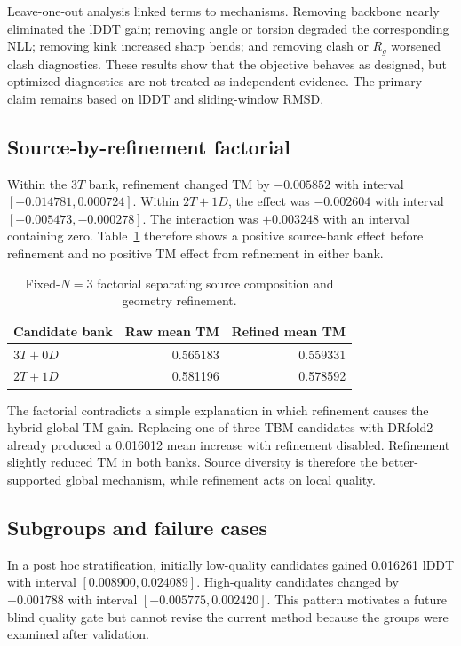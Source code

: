 \documentclass[12pt,a4paper,oneside]{report}
\begin{document}
Leave-one-out analysis linked terms to mechanisms. Removing backbone nearly eliminated
the lDDT gain; removing angle or torsion degraded the corresponding NLL; removing kink
increased sharp bends; and removing clash or $R_g$ worsened clash diagnostics. These
results show that the objective behaves as designed, but optimized diagnostics are not
treated as independent evidence. The primary claim remains based on lDDT and
sliding-window RMSD.

\subsection{Source-by-refinement factorial}

Within the $3T$ bank, refinement changed TM by $-0.005852$ with interval
$[-0.014781,0.000724]$. Within $2T+1D$, the effect was $-0.002604$ with interval
$[-0.005473,-0.000278]$. The interaction was $+0.003248$ with an interval containing
zero. Table~\ref{tab:factorial_en} therefore shows a positive source-bank effect before
refinement and no positive TM effect from refinement in either bank.

\begin{table}[H]
\centering
\caption{Fixed-$N=3$ factorial separating source composition and geometry refinement.}
\label{tab:factorial_en}
\begin{tabular}{lrr}
\toprule
Candidate bank & Raw mean TM & Refined mean TM \\
\midrule
$3T+0D$ & 0.565183 & 0.559331 \\
$2T+1D$ & 0.581196 & 0.578592 \\
\bottomrule
\end{tabular}
\end{table}

The factorial contradicts a simple explanation in which refinement causes the hybrid
global-TM gain. Replacing one of three TBM candidates with DRfold2 already produced a
0.016012 mean increase with refinement disabled. Refinement slightly reduced TM in both
banks. Source diversity is therefore the better-supported global mechanism, while
refinement acts on local quality.

\subsection{Subgroups and failure cases}

In a post hoc stratification, initially low-quality candidates gained 0.016261 lDDT with
interval $[0.008900,0.024089]$. High-quality candidates changed by $-0.001788$ with
interval $[-0.005775,0.002420]$. This pattern motivates a future blind quality gate but
cannot revise the current method because the groups were examined after validation.
\end{document}
